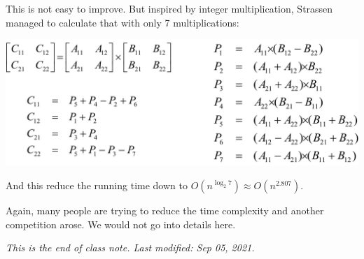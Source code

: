 \documentclass[11pt, a4paper]{COMP3711}
\begin{document}
\begin{spacing}{1.5}
    This is not easy to improve. But inspired by integer multiplication,
    Strassen managed to calculate that with only 7 multiplications:
    \begin{center}
        \includegraphics[scale=0.23]{images/02-matrix-mult.jpg}
    \end{center}
    
    And this reduce the running time down to 
    $O(n^{\log_2 7})\approx O(n^{2.807})$.

    Again, many people are trying to reduce the time complexity 
    and another competition arose. 
    We would not go into details here.

    {\it This is the end of class note. Last modified: Sep 05, 2021.}


\end{spacing}
\end{document}
